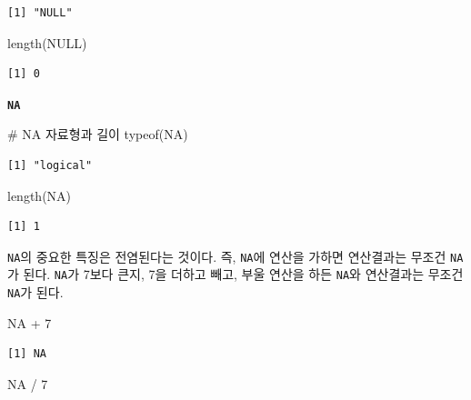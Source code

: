 \documentclass[
  letterpaper,
  chapter,a4paper,showtrims,openright,hidelinks]{oblivoir}
\newenvironment{Shaded}{\begin{snugshade}}{\end{snugshade}}
\newcommand{\CommentTok}[1]{\textcolor[rgb]{0.37,0.37,0.37}{#1}}
\newcommand{\ConstantTok}[1]{\textcolor[rgb]{0.56,0.35,0.01}{#1}}
\newcommand{\DecValTok}[1]{\textcolor[rgb]{0.68,0.00,0.00}{#1}}
\newcommand{\FunctionTok}[1]{\textcolor[rgb]{0.28,0.35,0.67}{#1}}
\newcommand{\NormalTok}[1]{\textcolor[rgb]{0.00,0.23,0.31}{#1}}
\newcommand{\SpecialCharTok}[1]{\textcolor[rgb]{0.37,0.37,0.37}{#1}}
\begin{document}
\begin{verbatim}
[1] "NULL"
\end{verbatim}

\begin{Shaded}
\begin{Highlighting}[]
\FunctionTok{length}\NormalTok{(}\ConstantTok{NULL}\NormalTok{)}
\end{Highlighting}
\end{Shaded}

\begin{verbatim}
[1] 0
\end{verbatim}

\textbf{\texttt{NA}}

\begin{Shaded}
\begin{Highlighting}[]
\CommentTok{\# NA 자료형과 길이}
\FunctionTok{typeof}\NormalTok{(}\ConstantTok{NA}\NormalTok{)}
\end{Highlighting}
\end{Shaded}

\begin{verbatim}
[1] "logical"
\end{verbatim}

\begin{Shaded}
\begin{Highlighting}[]
\FunctionTok{length}\NormalTok{(}\ConstantTok{NA}\NormalTok{)}
\end{Highlighting}
\end{Shaded}

\begin{verbatim}
[1] 1
\end{verbatim}

\texttt{NA}의 중요한 특징은 전염된다는 것이다. 즉, \texttt{NA}에 연산을
가하면 연산결과는 무조건 \texttt{NA}가 된다. \texttt{NA}가 7보다 큰지,
7을 더하고 빼고, 부울 연산을 하든 \texttt{NA}와 연산결과는 무조건
\texttt{NA}가 된다.

\begin{Shaded}
\begin{Highlighting}[]
\ConstantTok{NA} \SpecialCharTok{+} \DecValTok{7}
\end{Highlighting}
\end{Shaded}

\begin{verbatim}
[1] NA
\end{verbatim}

\begin{Shaded}
\begin{Highlighting}[]
\ConstantTok{NA} \SpecialCharTok{/} \DecValTok{7}
\end{Highlighting}
\end{Shaded}
\end{document}
